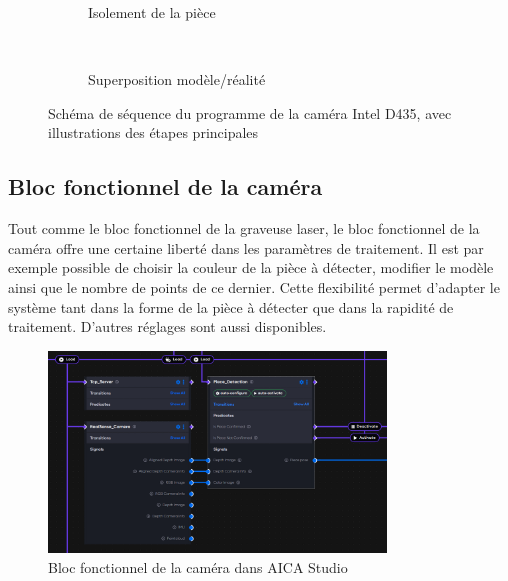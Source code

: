 \begin{figure}[htbp]
\begin{minipage}{0.4\textwidth}
\begin{subfigure}{0.8\linewidth}
            \caption{Isolement de la pièce}
        \end{subfigure}\\[0.2cm]
        \begin{subfigure}{0.8\linewidth}
            \caption{Superposition modèle/réalité}
        \end{subfigure}
    \end{minipage}
    \caption{Schéma de séquence du programme de la caméra Intel D435, avec illustrations des étapes principales}
    \label{fig:sequence_camera_illustre}
\end{figure}

\subsection{Bloc fonctionnel de la caméra}
Tout comme le bloc fonctionnel de la graveuse laser, le bloc fonctionnel de la caméra offre une certaine liberté dans les paramètres de traitement. Il est par exemple possible de choisir la couleur de la pièce à détecter, modifier le modèle ainsi que le nombre de points de ce dernier. Cette flexibilité permet d'adapter le système tant dans la forme de la pièce à détecter que dans la rapidité de traitement. D'autres réglages sont aussi disponibles.

\begin{figure}[H]
    \centering
    \includegraphics[width=0.8\textwidth]{assets/figures/AICA_Camera.png}
    \caption{Bloc fonctionnel de la caméra dans AICA Studio}
    \label{fig:camera_interface}
\end{figure}

